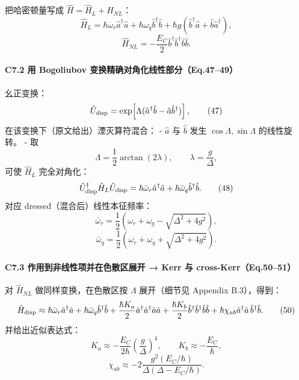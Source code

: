 \documentclass[12pt,a4paper,oneside]{ctexbook}
\let\oldparagraph\paragraph
\renewcommand{\paragraph}[1]{\oldparagraph{#1}\mbox{}}
\begin{document}
把哈密顿量写成 \(\hat H=\hat H_L+\hat H_{NL}\)： \[
\hat H_L=\hbar\omega_r\hat a^\dagger\hat a+\hbar\omega_q\hat b^\dagger\hat b
+\hbar g(\hat b^\dagger\hat a+\hat b\hat a^\dagger),
\tag{45}
\] \[
\hat H_{NL}=-\frac{E_C}{2}\hat b^\dagger\hat b^\dagger\hat b\hat b.
\tag{46}
\]

\paragraph{\texorpdfstring{\textbf{C7.2 用 Bogoliubov
变换精确对角化线性部分（Eq.47--49）}}{C7.2 用 Bogoliubov 变换精确对角化线性部分（Eq.47--49）}}\label{c7.2-ux7528-bogoliubov-ux53d8ux6362ux7cbeux786eux5bf9ux89d2ux5316ux7ebfux6027ux90e8ux5206eq.4749}

幺正变换： \[
\hat U_{\rm disp}=\exp\!\left[\Lambda(\hat a^\dagger\hat b-\hat a\hat b^\dagger)\right],
\tag{47}
\] 在该变换下（原文给出）湮灭算符混合： - \(\hat a\) 与 \(\hat b\) 发生
\(\cos\Lambda,\sin\Lambda\) 的线性旋转。 - 取 \[
  \Lambda=\frac12\arctan(2\lambda),\qquad \lambda=\frac{g}{\Delta},
  \] 可使 \(\hat H_L\) 完全对角化： \[
\hat U_{\rm disp}^\dagger \hat H_L \hat U_{\rm disp}
=\hbar\bar\omega_r\hat a^\dagger\hat a+\hbar\bar\omega_q\hat b^\dagger\hat b.
\tag{48}
\] 对应 dressed（混合后）线性本征频率： \[
\bar\omega_r=\frac12\left(\omega_r+\omega_q-\sqrt{\Delta^2+4g^2}\right),
\tag{49a}
\] \[
\bar\omega_q=\frac12\left(\omega_r+\omega_q+\sqrt{\Delta^2+4g^2}\right).
\tag{49b}
\]

\paragraph{\texorpdfstring{\textbf{C7.3 作用到非线性项并在色散区展开 →
Kerr 与
cross-Kerr（Eq.50--51）}}{C7.3 作用到非线性项并在色散区展开 → Kerr 与 cross-Kerr（Eq.50--51）}}\label{c7.3-ux4f5cux7528ux5230ux975eux7ebfux6027ux9879ux5e76ux5728ux8272ux6563ux533aux5c55ux5f00-kerr-ux4e0e-cross-kerreq.5051}

对 \(\hat H_{NL}\) 做同样变换，在色散区按 \(\Lambda\) 展开（细节见
Appendix B.3），得到： \[
\hat H_{\rm disp}\approx
\hbar\bar\omega_r\hat a^\dagger\hat a+\hbar\bar\omega_q\hat b^\dagger\hat b
+\frac{\hbar K_a}{2}\hat a^\dagger\hat a^\dagger\hat a\hat a
+\frac{\hbar K_b}{2}\hat b^\dagger\hat b^\dagger\hat b\hat b
+\hbar\chi_{ab}\hat a^\dagger\hat a\,\hat b^\dagger\hat b.
\tag{50}
\] 并给出近似表达式： \[
K_a\approx -\frac{E_C}{2\hbar}\left(\frac{g}{\Delta}\right)^4,\qquad
K_b\approx -\frac{E_C}{\hbar},
\tag{51a}
\] \[
\chi_{ab}\approx -2\frac{g^2(E_C/\hbar)}{\Delta(\Delta-E_C/\hbar)}.
\tag{51b}
\]
\end{document}
